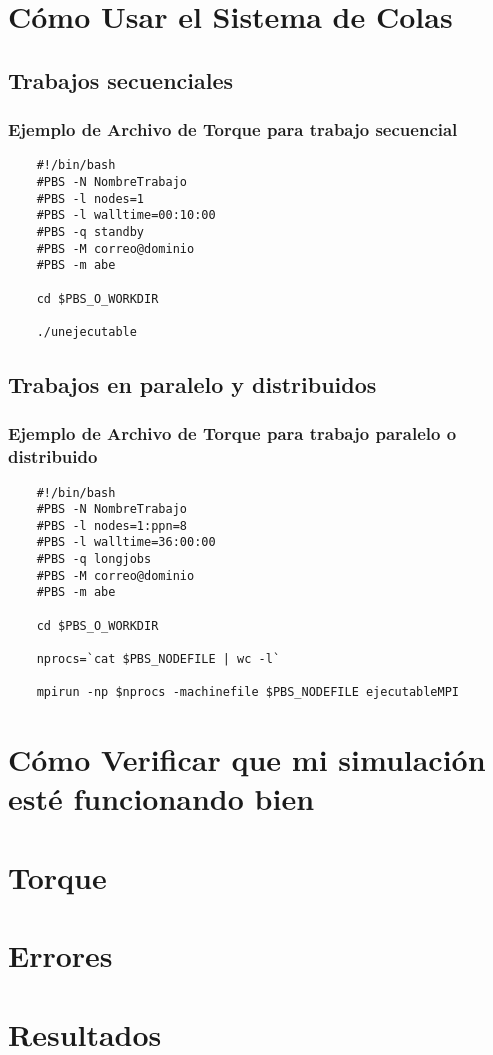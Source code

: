 
\section{Cómo Usar el Sistema de Colas}
    \subsection{Trabajos secuenciales}
    \subsubsection{Ejemplo de Archivo de Torque para trabajo secuencial}
    \begin{verbatim}
    #!/bin/bash
    #PBS -N NombreTrabajo
    #PBS -l nodes=1
    #PBS -l walltime=00:10:00
    #PBS -q standby
    #PBS -M correo@dominio
    #PBS -m abe

    cd $PBS_O_WORKDIR

    ./unejecutable
    \end{verbatim}

    \subsection{Trabajos en paralelo y distribuidos}
    \subsubsection{Ejemplo de Archivo de Torque para trabajo paralelo o distribuido}
    \begin{verbatim}
    #!/bin/bash
    #PBS -N NombreTrabajo
    #PBS -l nodes=1:ppn=8
    #PBS -l walltime=36:00:00
    #PBS -q longjobs
    #PBS -M correo@dominio
    #PBS -m abe

    cd $PBS_O_WORKDIR

    nprocs=`cat $PBS_NODEFILE | wc -l`

    mpirun -np $nprocs -machinefile $PBS_NODEFILE ejecutableMPI
    \end{verbatim}
\section{Cómo Verificar que mi simulación esté funcionando bien}
\section{Torque}
\section{Errores}
\section{Resultados}

